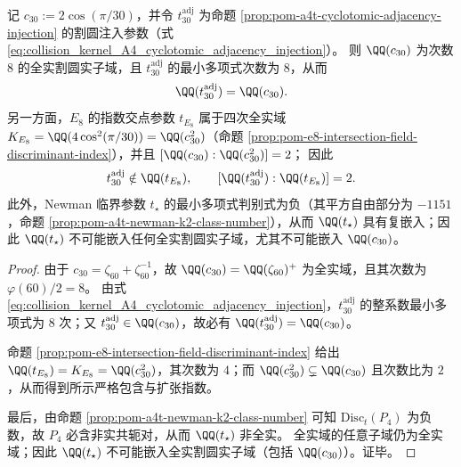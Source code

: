 \begin{corollary}\label{cor:pom-a4t-e8-two-resolution-layer-nonembedding}
记 \(c_{30}:=2\cos(\pi/30)\)，并令 \(t_{30}^{\mathrm{adj}}\) 为命题 \ref{prop:pom-a4t-cyclotomic-adjacency-injection} 的割圆注入参数（式 \eqref{eq:collision_kernel_A4_cyclotomic_adjacency_injection}）。
则 \(\QQ(c_{30})\) 为次数 \(8\) 的全实割圆实子域，且 \(t_{30}^{\mathrm{adj}}\) 的最小多项式次数为 \(8\)，从而
\[
\QQ(t_{30}^{\mathrm{adj}})=\QQ(c_{30}).
\]
另一方面，\(E_8\) 的指数交点参数 \(t_{E_8}\) 属于四次全实域 \(K_{E_8}=\QQ(4\cos^2(\pi/30))=\QQ(c_{30}^2)\)（命题 \ref{prop:pom-e8-intersection-field-discriminant-index}），并且 \([\QQ(c_{30}):\QQ(c_{30}^2)]=2\)；
因此
\[
t_{30}^{\mathrm{adj}}\notin \QQ(t_{E_8}),
\qquad
[\QQ(t_{30}^{\mathrm{adj}}):\QQ(t_{E_8})]=2.
\]
此外，Newman 临界参数 \(t_\star\) 的最小多项式判别式为负（其平方自由部分为 \(-1151\)，命题 \ref{prop:pom-a4t-newman-k2-class-number}），从而 \(\QQ(t_\star)\) 具有复嵌入；因此 \(\QQ(t_\star)\) 不可能嵌入任何全实割圆实子域，尤其不可能嵌入 \(\QQ(c_{30})\)。
\end{corollary}
\begin{proof}
由于 \(c_{30}=\zeta_{60}+\zeta_{60}^{-1}\)，故 \(\QQ(c_{30})=\QQ(\zeta_{60})^+\) 为全实域，且其次数为 \(\varphi(60)/2=8\)。
由式 \eqref{eq:collision_kernel_A4_cyclotomic_adjacency_injection}，\(t_{30}^{\mathrm{adj}}\) 的整系数最小多项式为 \(8\) 次；又 \(t_{30}^{\mathrm{adj}}\in\QQ(c_{30})\)，故必有 \(\QQ(t_{30}^{\mathrm{adj}})=\QQ(c_{30})\)。
\par
命题 \ref{prop:pom-e8-intersection-field-discriminant-index} 给出 \(\QQ(t_{E_8})=K_{E_8}=\QQ(c_{30}^2)\)，其次数为 \(4\)；而 \(\QQ(c_{30}^2)\subsetneq\QQ(c_{30})\) 且次数比为 \(2\)，从而得到所示严格包含与扩张指数。
\par
最后，由命题 \ref{prop:pom-a4t-newman-k2-class-number} 可知 \(\mathrm{Disc}_t(P_4)\) 为负数，故 \(P_4\) 必含非实共轭对，从而 \(\QQ(t_\star)\) 非全实。
全实域的任意子域仍为全实域；因此 \(\QQ(t_\star)\) 不可能嵌入全实割圆实子域（包括 \(\QQ(c_{30})\)）。证毕。
\end{proof}

